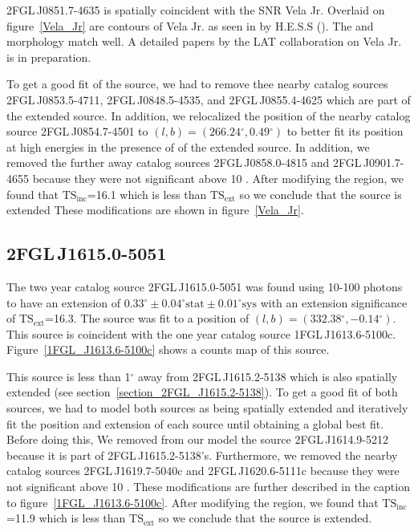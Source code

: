 \documentclass[12pt,preprint]{aastex}
\newcommand{\gev}{\text{GeV}\xspace}
\newcommand{\tev}{\text{TeV}\xspace}
\newcommand{\tsext}{{\ensuremath{\text{TS}_{\text{ext}}}}\xspace}
\newcommand{\tsinc}{\ensuremath{\text{TS}_{\text{inc}}}\xspace}
\newcommand{\sys}{\text{sys}\xspace}
\newcommand{\stat}{\text{stat}\xspace}
\renewcommand{\deg}{\ensuremath{^\circ}\xspace}
\begin{document}
2FGL\,J0851.7-4635 is spatially coincident with the SNR Vela Jr.
Overlaid on figure~\ref{Vela_Jr} are contours of Vela Jr. as seen in
\tev by H.E.S.S (\cite{vela_jr_hess}).  The \gev and \tev morphology
match well.  A detailed papers by the LAT collaboration on Vela Jr. is
in preparation.

To get a good fit of the source, we had to remove thee nearby catalog
sources 2FGL\,J0853.5-4711, 2FGL\,J0848.5-4535, and 2FGL\,J0855.4-4625
which are part of the extended source.  In addition, we relocalized
the position of the nearby catalog source 2FGL\,J0854.7-4501 to
$(l,b)=(266.24\deg,0.49\deg)$ to better fit its position at high energies
in the presence of of the extended source.  In addition, we removed the
further away catalog sources 2FGL\,J0858.0-4815 and 2FGL\,J0901.7-4655
because they were not significant above 10 \gev.  After modifying
the region, we found that \tsinc=16.1 which is less than \tsext so we
conclude that the source is extended These modifications are shown in
figure~\ref{Vela_Jr}.

\subsection{2FGL\,J1615.0-5051}
\label{section_2FGL_J1615.0-5051}


The two year catalog source 2FGL\,J1615.0-5051 was found using 10-100 \tev
photons to have an extension of $0.33\deg\pm0.04\deg\stat\pm0.01\deg\sys$
with an extension significance of \tsext=16.3.  The source
was fit to a position of $(l,b)=(332.38\deg,-0.14\deg)$.
This source is coincident with the one year catalog source
1FGL\,J1613.6-5100c. Figure~\ref{1FGL_J1613.6-5100c} shows a counts map
of this source.

This source is less than 1\deg away from 2FGL\,J1615.2-5138 which is
also spatially extended (see section~\ref{section_2FGL_J1615.2-5138}).
To get a good fit of both sources, we had to model both sources as
being spatially extended and iteratively fit the position and extension
of each source until obtaining a global best fit.  Before doing this,
We removed from our model the source 2FGL\,J1614.9-5212 because it is
part of 2FGL\,J1615.2-5138's. Furthermore, we removed the nearby catalog
sources 2FGL\,J1619.7-5040c and 2FGL\,J1620.6-5111c because they were not
significant above 10 \gev.  These modifications are further described
in the caption to figure~\ref{1FGL_J1613.6-5100c}.  After modifying
the region, we found that \tsinc=11.9 which is less than \tsext so we
conclude that the source is extended.
\end{document}
